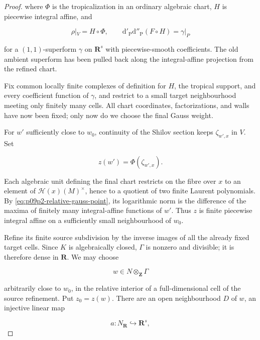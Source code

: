 \begin{proof}
where \(\Phi\) is the tropicalization in an ordinary algebraic chart,
\(H\) is piecewise integral affine, and

\begin{equation}
\label{eq:p09p2-common-chart}
 \rho|_V=H\circ\Phi,
 \qquad
 \mathrm d'_{\mathrm P}\mathrm d''_{\mathrm P}(F\circ H)
          =\gamma|_P
\end{equation}

for a \((1,1)\)-superform \(\gamma\) on \(\mathbf R^s\) with
piecewise-smooth coefficients.  The old ambient superform has been pulled
back along the integral-affine projection from the refined chart.

Fix common locally finite complexes of definition for \(H\), the tropical
support, and every coefficient function of \(\gamma\), and restrict to a
small target neighbourhood meeting only finitely many cells.  All chart
coordinates, factorizations, and walls have now been fixed; only now do we
choose the final Gauss weight.

For \(w'\) sufficiently close to \(w_0\), continuity of the Shilov section
keeps \(\zeta_{w',x}\) in \(V\).  Set

\[
                         z(w')=\Phi(\zeta_{w',x}).
\]

Each algebraic unit defining the final chart restricts on the fibre over
\(x\) to an element of \(\mathcal H(x)(M)^\times\), hence to a quotient of
two finite Laurent polynomials.  By \eqref{eq:p09p2-relative-gauss-point},
its logarithmic norm is the difference of the maxima of finitely many
integral-affine functions of \(w'\).  Thus \(z\) is finite piecewise
integral affine on a sufficiently small neighbourhood of \(w_0\).

Refine its finite source subdivision by the inverse images of all the
already fixed target cells.  Since \(K\) is algebraically closed,
\(\Gamma\) is nonzero and divisible; it is therefore dense in \(\mathbf R\).
We may choose

\[
                         w\in N\otimes_{\mathbf Z}\Gamma
\]

arbitrarily close to \(w_0\), in the relative interior of a
full-dimensional cell of the source refinement.  Put \(z_0=z(w)\).  There
are an open neighbourhood \(D\) of \(w\), an injective linear map

\begin{equation}
\label{eq:p09p2-gauss-slope-map}
                         a:N_{\mathbf R}\hookrightarrow\mathbf R^s,
\end{equation}


\end{proof}
